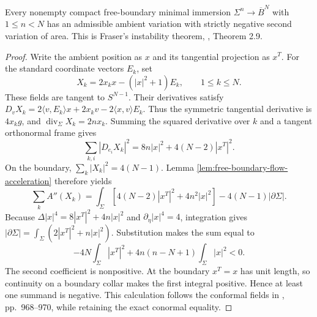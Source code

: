 \begin{theorem}\label{thm:free-boundary-ball-instability}
Every nonempty compact free-boundary minimal immersion $\Sigma^n\to\overline B^N$ with $1\leq n<N$ has an admissible ambient variation with strictly negative second variation of area. This is Fraser's instability theorem, \cite{Fraser00}, Theorem 2.9.
\end{theorem}
\begin{proof}
Write the ambient position as $x$ and its tangential projection as $x^T$. For the standard coordinate vectors $E_k$, set
\[
 X_k=2x_kx-(|x|^2+1)E_k,\qquad 1\leq k\leq N.
\]
These fields are tangent to $S^{N-1}$. Their derivatives satisfy
$D_vX_k=2\langle v,E_k\rangle x+2x_kv-2\langle x,v\rangle E_k$.
Thus the symmetric tangential derivative is $4x_kg$, and $\operatorname{div}_\Sigma X_k=2nx_k$. Summing the squared derivative over $k$ and a tangent orthonormal frame gives
\[
 \sum_{k,i}|D_{e_i}X_k|^2=8n|x|^2+4(N-2)|x^T|^2.
\]
On the boundary, $\sum_k|X_k|^2=4(N-1)$. Lemma \ref{lem:free-boundary-flow-acceleration} therefore yields
\[
 \sum_k A''(X_k)=\int_\Sigma[4(N-2)|x^T|^2+4n^2|x|^2]-4(N-1)|\partial\Sigma|.
\]
Because $\Delta|x|^4=8|x^T|^2+4n|x|^2$ and $\partial_\eta|x|^4=4$, integration gives
$|\partial\Sigma|=\int_\Sigma(2|x^T|^2+n|x|^2)$.
Substitution makes the sum equal to
\[
 -4N\int_\Sigma|x^T|^2+4n(n-N+1)\int_\Sigma|x|^2<0.
\]
The second coefficient is nonpositive. At the boundary $x^T=x$ has unit length, so continuity on a boundary collar makes the first integral positive. Hence at least one summand is negative. This calculation follows the conformal fields in \cite{Fraser00}, pp.~968--970, while retaining the exact conormal equality.
\end{proof}

